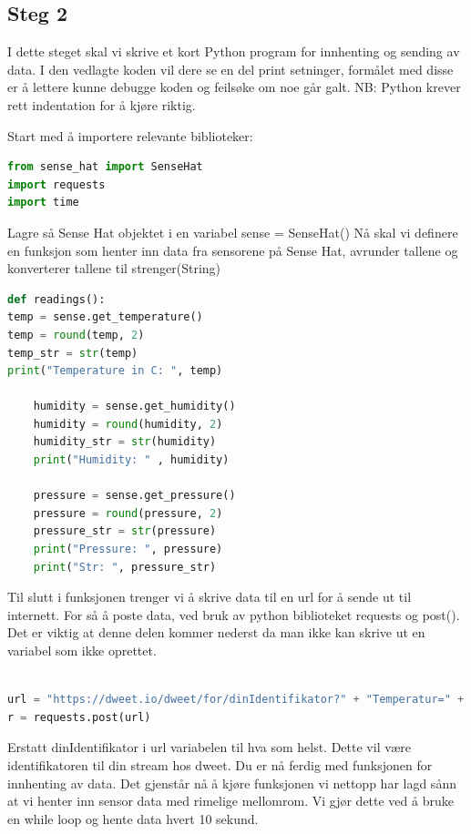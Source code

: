 \documentclass{article}
\begin{document}
\begin{appendices}
\subsection{Steg 2}

I dette steget skal vi skrive et kort Python program for innhenting og sending av data. I den vedlagte koden vil dere se en del print setninger, formålet med disse er å lettere kunne debugge koden og feilsøke om noe går galt.
NB: Python krever rett indentation for å kjøre riktig.

Start med å importere relevante biblioteker:
\begin{lstlisting}[language=Python, caption=ApendiX B del 1]
from sense_hat import SenseHat
import requests
import time
	\end{lstlisting}

Lagre så Sense Hat objektet i en variabel
sense = SenseHat()
Nå skal vi definere en funksjon som henter inn data fra sensorene på Sense Hat, avrunder tallene og konverterer tallene til strenger(String)
\begin{lstlisting}[language=Python, caption=ApendiX B del 2]
def readings():
temp = sense.get_temperature()
temp = round(temp, 2)
temp_str = str(temp)
print("Temperature in C: ", temp)

	humidity = sense.get_humidity()
	humidity = round(humidity, 2)
	humidity_str = str(humidity)
	print("Humidity: " , humidity)
	
	pressure = sense.get_pressure()
	pressure = round(pressure, 2)
	pressure_str = str(pressure)
	print("Pressure: ", pressure)
	print("Str: ", pressure_str)
	\end{lstlisting}

Til slutt i funksjonen trenger vi å skrive data til en url for å sende ut til internett. For så å poste data, ved bruk av python biblioteket requests og post(). Det er viktig at denne delen kommer nederst da man ikke kan skrive ut en variabel som ikke oprettet.

\begin{lstlisting}[language=Python, caption=ApendiX B del 3]

url = "https://dweet.io/dweet/for/dinIdentifikator?" + "Temperatur=" + temp_str + "&Humidity=" + humidity_str + "&Pressure=" + pressure_str
r = requests.post(url)
\end{lstlisting}


Erstatt dinIdentifikator i url variabelen til hva som helst. Dette vil være identifikatoren til din stream hos dweet. Du er nå ferdig med funksjonen for innhenting av data. 
Det gjenstår nå å kjøre funksjonen vi nettopp har lagd sånn at vi henter inn sensor data med rimelige mellomrom. Vi gjør dette ved å bruke en while loop og hente data hvert 10 sekund.


\end{appendices}
\end{document}
